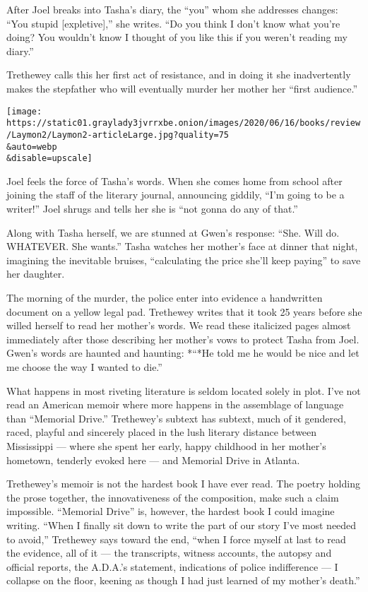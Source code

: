 After Joel breaks into Tasha's diary, the ``you'' whom she addresses
changes: ``You stupid {[}expletive{]},'' she writes. ``Do you think I
don't know what you're doing? You wouldn't know I thought of you like
this if you weren't reading my diary.''

Trethewey calls this her first act of resistance, and in doing it she
inadvertently makes the stepfather who will eventually murder her mother
her ``first audience.''

\texttt{[image: https://static01.graylady3jvrrxbe.onion/images/2020/06/16/books/review/Laymon2/Laymon2-articleLarge.jpg?quality=75\\\&auto=webp\\\&disable=upscale]}

Joel feels the force of Tasha's words. When she comes home from school
after joining the staff of the literary journal, announcing giddily,
``I'm going to be a writer!'' Joel shrugs and tells her she is ``not
gonna do any of that.''

Along with Tasha herself, we are stunned at Gwen's response: ``She. Will
do. WHATEVER. She wants.'' Tasha watches her mother's face at dinner
that night, imagining the inevitable bruises, ``calculating the price
she'll keep paying'' to save her daughter.

The morning of the murder, the police enter into evidence a handwritten
document on a yellow legal pad. Trethewey writes that it took 25 years
before she willed herself to read her mother's words. We read these
italicized pages almost immediately after those describing her mother's
vows to protect Tasha from Joel. Gwen's words are haunted and haunting:
*``*He told me he would be nice and let me choose the way I wanted to
die.''

What happens in most riveting literature is seldom located solely in
plot. I've not read an American memoir where more happens in the
assemblage of language than ``Memorial Drive.'' Trethewey's subtext has
subtext, much of it gendered, raced, playful and sincerely placed in the
lush literary distance between Mississippi --- where she spent her
early, happy childhood in her mother's hometown, tenderly evoked here
--- and Memorial Drive in Atlanta.

Trethewey's memoir is not the hardest book I have ever read. The poetry
holding the prose together, the innovativeness of the composition, make
such a claim impossible. ``Memorial Drive'' is, however, the hardest
book I could imagine writing. ``When I finally sit down to write the
part of our story I've most needed to avoid,'' Trethewey says toward the
end, ``when I force myself at last to read the evidence, all of it ---
the transcripts, witness accounts, the autopsy and official reports, the
A.D.A.'s statement, indications of police indifference --- I collapse on
the floor, keening as though I had just learned of my mother's death.''

